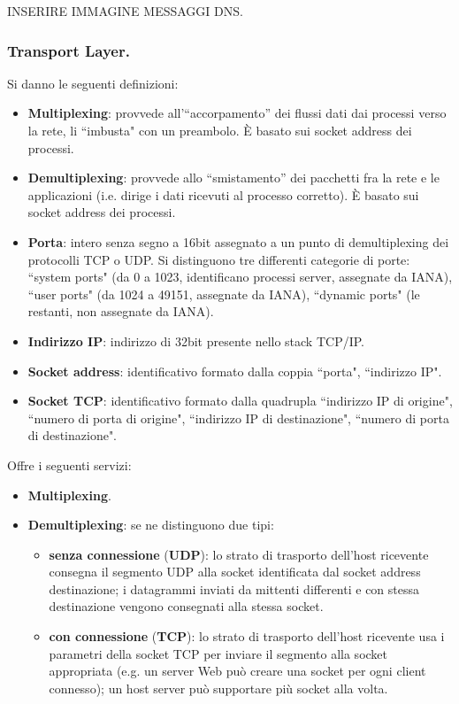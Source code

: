 \documentclass[11pt, italian, openany]{book}
\begin{document}
\begin{sloppypar}
INSERIRE IMMAGINE MESSAGGI DNS.


\pagebreak

\subsubsection*{Transport Layer.}
Si danno le seguenti definizioni:
\begin{itemize}[topsep=0pt]
	\itemsep-0.3em
	\item \textbf{Multiplexing}: provvede all'``accorpamento” dei flussi dati dai processi verso la rete, li ``imbusta" con un preambolo. \`E
	basato sui socket address dei processi.
	\item \textbf{Demultiplexing}: provvede allo ``smistamento” dei pacchetti fra la rete e le applicazioni (i.e. dirige i dati ricevuti al
	processo corretto). \`E basato sui socket address dei processi.
	\item \textbf{Porta}: intero senza segno a 16bit assegnato a un punto di demultiplexing dei protocolli TCP o UDP. Si distinguono tre differenti
	categorie di porte: ``system ports" (da 0 a 1023, identificano processi server, assegnate da IANA), ``user ports" (da 1024 a 49151, assegnate
	da IANA), ``dynamic ports" (le restanti, non assegnate da IANA).
	\item \textbf{Indirizzo IP}: indirizzo di 32bit presente nello stack TCP/IP.
	\item \textbf{Socket address}: identificativo formato dalla coppia ``porta", ``indirizzo IP".
	\item \textbf{Socket TCP}: identificativo formato dalla quadrupla ``indirizzo IP di origine", ``numero di porta di origine", ``indirizzo IP di
	destinazione", ``numero di porta di destinazione".
\end{itemize}

Offre i seguenti servizi:
\begin{itemize}[topsep=0pt]
	\itemsep-0.3em
	\item \textbf{Multiplexing}.
	\item \textbf{Demultiplexing}: se ne distinguono due tipi:
	\vspace{-3.5mm}
	\begin{itemize}
		\itemsep-0.3em
		\item \textbf{senza connessione} (\textbf{UDP}): lo strato di trasporto dell'host ricevente consegna il segmento UDP alla socket
		identificata dal socket address destinazione; i datagrammi inviati da mittenti differenti e con stessa destinazione vengono consegnati
		alla stessa socket.
		\item \textbf{con connessione} (\textbf{TCP}): lo strato di trasporto dell'host ricevente usa i parametri della socket TCP per inviare il
		segmento alla socket appropriata (e.g. un server Web pu\`o creare una socket per ogni client connesso); un host server pu\`o supportare
		pi\`u socket alla volta.
	\end{itemize}


\end{itemize}
\end{sloppypar}
\end{document}
